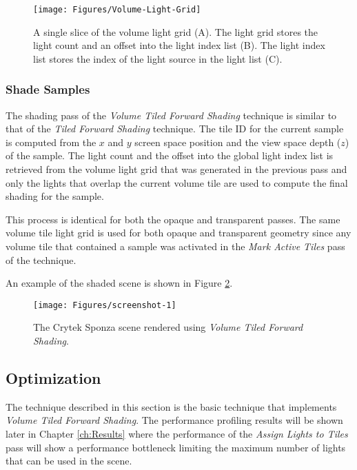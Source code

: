 \begin{figure}[h]
\centering
\texttt{[image: Figures/Volume-Light-Grid]}
\decoRule
\caption{A single slice of the volume light grid (A). The light grid stores the light count and an offset into the light index list (B). The light index list stores the index of the light source in the light list (C).}
\label{fig:Volume-Light-Grid}
\end{figure}

\subsubsection{Shade Samples}

The shading pass of the \emph{Volume Tiled Forward Shading} technique is similar to that of the \emph{Tiled Forward Shading} technique. The tile ID for the current sample is computed from the $x$ and $y$ screen space position and the view space depth ($z$) of the sample. The light count and the offset into the global light index list is retrieved from the volume light grid that was generated in the previous pass and only the lights that overlap the current volume tile are used to compute the final shading for the sample.

This process is identical for both the opaque and transparent passes. The same volume tile light grid is used for both opaque and transparent geometry since any volume tile that contained a sample was activated in the \emph{Mark Active Tiles} pass of the technique.

An example of the shaded scene is shown in Figure \ref{fig:screenshot-1}.

\begin{figure}[H]
\centering
\texttt{[image: Figures/screenshot-1]}
\decoRule
\caption{The Crytek Sponza scene rendered using \emph{Volume Tiled Forward Shading}.}
\label{fig:screenshot-1}
\end{figure}

\subsection{Optimization}
\label{sec:Optimization}

The technique described in this section is the basic technique that implements \emph{Volume Tiled Forward Shading}. The performance profiling results will be shown later in Chapter \ref{ch:Results} where the performance of the \emph{Assign Lights to Tiles} pass will show a performance bottleneck limiting the maximum number of lights that can be used in the scene.

